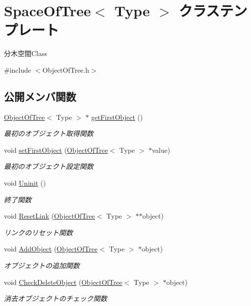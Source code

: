 \hypertarget{class_space_of_tree}{}\section{Space\+Of\+Tree$<$ Type $>$ クラステンプレート}
\label{class_space_of_tree}


分木空間\+Class  




{\ttfamily \#include $<$Object\+Of\+Tree.\+h$>$}

\subsection*{公開メンバ関数}
\begin{DoxyCompactItemize}
\item 
\mbox{\hyperlink{class_object_of_tree}{Object\+Of\+Tree}}$<$ Type $>$ $\ast$ \mbox{\hyperlink{class_space_of_tree_a97ee8bf10b8d88d49e61875c88608b15}{get\+First\+Object}} ()
\begin{DoxyCompactList}\small\item\em 最初のオブジェクト取得関数 \end{DoxyCompactList}\item 
void \mbox{\hyperlink{class_space_of_tree_a43844bf7bfbf0d021b9ae4708cb2e6f4}{set\+First\+Object}} (\mbox{\hyperlink{class_object_of_tree}{Object\+Of\+Tree}}$<$ Type $>$ $\ast$value)
\begin{DoxyCompactList}\small\item\em 最初のオブジェクト設定関数 \end{DoxyCompactList}\item 
void \mbox{\hyperlink{class_space_of_tree_a8f7238becd1df9192e5f5ddc442b7ee3}{Uninit}} ()
\begin{DoxyCompactList}\small\item\em 終了関数 \end{DoxyCompactList}\item 
void \mbox{\hyperlink{class_space_of_tree_a3231408434cb3066768cfd9d33d86190}{Reset\+Link}} (\mbox{\hyperlink{class_object_of_tree}{Object\+Of\+Tree}}$<$ Type $>$ $\ast$$\ast$object)
\begin{DoxyCompactList}\small\item\em リンクのリセット関数 \end{DoxyCompactList}\item 
void \mbox{\hyperlink{class_space_of_tree_a8156722056d7b2ab354ff22235772d7e}{Add\+Object}} (\mbox{\hyperlink{class_object_of_tree}{Object\+Of\+Tree}}$<$ Type $>$ $\ast$object)
\begin{DoxyCompactList}\small\item\em オブジェクトの追加関数 \end{DoxyCompactList}\item 
void \mbox{\hyperlink{class_space_of_tree_a746aef6b3bafdde17daa5125cc9bc43c}{Check\+Delete\+Object}} (\mbox{\hyperlink{class_object_of_tree}{Object\+Of\+Tree}}$<$ Type $>$ $\ast$object)
\begin{DoxyCompactList}\small\item\em 消去オブジェクトのチェック関数 \end{DoxyCompactList}\end{DoxyCompactItemize}
